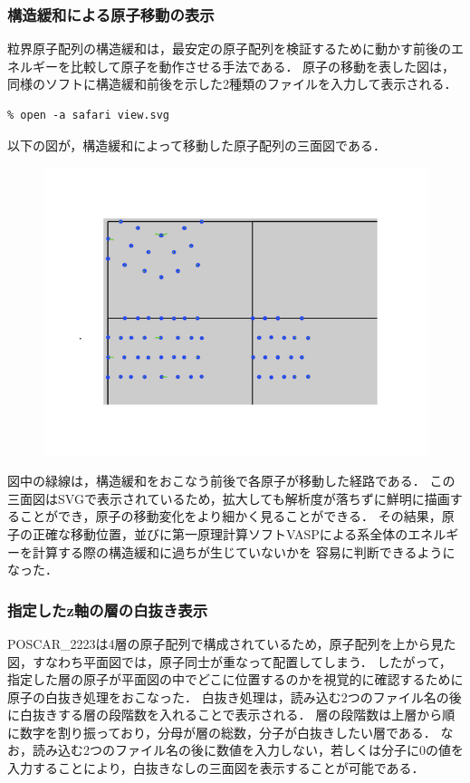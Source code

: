 \subsubsection{構造緩和による原子移動の表示}
粒界原子配列の構造緩和は，最安定の原子配列を検証するために動かす前後のエネルギーを比較して原子を動作させる手法である．
原子の移動を表した図は，同様のソフトに構造緩和前後を示した2種類のファイルを入力して表示される．
\begin{lstlisting}[style=customCsh,basicstyle={\scriptsize\ttfamily}]
% ruby viewer.rb POSCAR_after POSCAR_before
% open -a safari view.svg 
\end{lstlisting}
以下の図が，構造緩和によって移動した原子配列の三面図である．

\begin{figure}[htbp]\begin{center}
\includegraphics[width=12cm,bb= 0 0 937 753]{../figs/./boundary_narita.011.jpeg}
\caption{}
\label{default}\end{center}\end{figure}
図中の緑線は，構造緩和をおこなう前後で各原子が移動した経路である．
この三面図はSVGで表示されているため，拡大しても解析度が落ちずに鮮明に描画することができ，原子の移動変化をより細かく見ることができる．
その結果，原子の正確な移動位置，並びに第一原理計算ソフトVASPによる系全体のエネルギーを計算する際の構造緩和に過ちが生じていないかを
容易に判断できるようになった．

\subsubsection{指定したz軸の層の白抜き表示}
POSCAR\_2223は4層の原子配列で構成されているため，原子配列を上から見た図，すなわち平面図では，原子同士が重なって配置してしまう．
したがって，指定した層の原子が平面図の中でどこに位置するのかを視覚的に確認するために原子の白抜き処理をおこなった．
白抜き処理は，読み込む2つのファイル名の後に白抜きする層の段階数を入れることで表示される．
層の段階数は上層から順に数字を割り振っており，分母が層の総数，分子が白抜きしたい層である．
なお，読み込む2つのファイル名の後に数値を入力しない，若しくは分子に0の値を入力することにより，白抜きなしの三面図を表示することが可能である．


